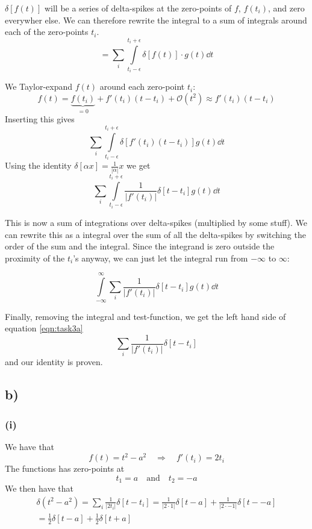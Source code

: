 \documentclass[10pt,a4paper]{article}
\newcommand{\infint}{\int\limits_{-\infty}^{\infty}}
\begin{document}
$\delta[f(t)]$ will be a series of delta-spikes at the zero-points of $f$, $f(t_i)$, and zero everywher else. We can therefore rewrite the integral to a sum of integrals around each of the zero-points $t_i$.
\begin{equation}
    = \sum_i \int\limits_{t_i - \epsilon}^{t_i+\epsilon} \delta[f(t)]\cdot g(t) \dd{t}
\end{equation}

We Taylor-expand $f(t)$ around each zero-point $t_i$:
\begin{equation}
    f(t) = \underbrace{f(t_i)}_{=0} + f'(t_i)(t-t_i) + \mathcal{O}(t^2) \approx f'(t_i)(t-t_i)
\end{equation}
Inserting this gives
\begin{equation}
    \sum_i \int\limits_{t_i - \epsilon}^{t_i+\epsilon} \delta[f'(t_i)(t-t_i)]g(t)\dd{t}
\end{equation}
Using the identity $\delta[\alpha x] = \frac{1}{|\alpha|}x$ we get
\begin{equation}
    \sum_i \int\limits_{t_i - \epsilon}^{t_i+\epsilon} \frac{1}{|f'(t_i)|}\delta[t-t_i]g(t)\dd{t}
\end{equation}

This is now a sum of integrations over delta-spikes (multiplied by some stuff). We can rewrite this as a integral over the sum of all the delta-spikes by switching the order of the sum and the integral. Since the integrand is zero outside the proximity of the $t_i$'s anyway, we can just let the integral run from $-\infty$ to $\infty$:

\begin{equation}
    \infint \sum_i \frac{1}{|f'(t_i)|}\delta[t-t_i]g(t)\dd{t}
\end{equation}


Finally, removing the integral and test-function, we get the left hand side of equation \ref{eqn:task3a}
\begin{equation}
    \sum_i \frac{1}{|f'(t_i)|} \delta[t-t_i]
\end{equation}
and our identity is proven.



\subsection*{b)}
\subsubsection*{(i)}
We have that
\begin{equation}
    f(t) = t^2 - a^2 \quad\Rightarrow\quad f'(t_i) = 2t_i
\end{equation}
The functions has zero-points at
\begin{equation}
    t_1 = a \quad \text{and} \quad t_2 = -a
\end{equation}
We then have that
\begin{align}
    \delta(t^2-a^2) = \sum_i \frac{1}{|2t_i|}\delta[t-t_i] 
    = \frac{1}{|2\cdot 1|} \delta[t-a] + \frac{1}{|2\cdot -1|} \delta[t--a] \\
    = \frac{1}{2}\delta[t-a] + \frac{1}{2}\delta[t+a]
\end{align}
\end{document}
